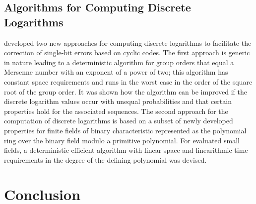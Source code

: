 \documentclass[a4paper, 11pt]{article}
\begin{document}
\subsection{Algorithms for Computing Discrete Logarithms}
\citet{grymel2013error} developed two new approaches for computing discrete logarithms to facilitate the correction of single-bit errors based on cyclic codes. The first approach is generic in nature leading to a deterministic algorithm for group orders that equal a Mersenne number with an exponent of a power of two; this algorithm has constant space requirements and runs in the worst case in the order of the square root of the group order. It was shown how the algorithm can be improved if the discrete logarithm values occur with unequal probabilities and that certain properties hold for the associated sequences. The second approach for the computation of discrete logarithms is based on a subset of newly developed properties for finite fields of binary characteristic represented as the polynomial ring over the binary field modulo a primitive polynomial. For evaluated small fields, a deterministic efficient algorithm with linear space and linearithmic time requirements in the degree of the defining polynomial was devised.

\clearpage
\section{Conclusion}


\newpage
%
%
%

\newpage


\end{document}
